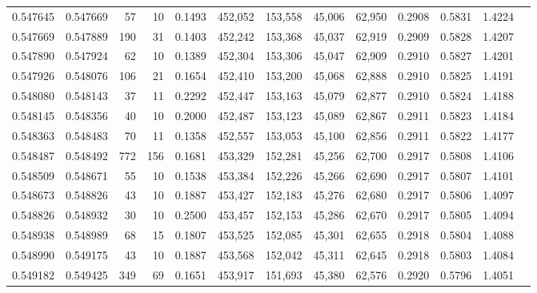 \begin{tabular}{rrrrrrrrrrrrr}
0.547645 & 0.547669 &    57 &  10 &                                     0.1493 & 452,052 & 153,558 &  45,006 &  62,950 & 0.2908 & 0.5831 & 1.4224 \\
0.547669 & 0.547889 &   190 &  31 &                                     0.1403 & 452,242 & 153,368 &  45,037 &  62,919 & 0.2909 & 0.5828 & 1.4207 \\
0.547890 & 0.547924 &    62 &  10 &                                     0.1389 & 452,304 & 153,306 &  45,047 &  62,909 & 0.2910 & 0.5827 & 1.4201 \\
0.547926 & 0.548076 &   106 &  21 &                                     0.1654 & 452,410 & 153,200 &  45,068 &  62,888 & 0.2910 & 0.5825 & 1.4191 \\
0.548080 & 0.548143 &    37 &  11 &                                     0.2292 & 452,447 & 153,163 &  45,079 &  62,877 & 0.2910 & 0.5824 & 1.4188 \\
0.548145 & 0.548356 &    40 &  10 &                                     0.2000 & 452,487 & 153,123 &  45,089 &  62,867 & 0.2911 & 0.5823 & 1.4184 \\
0.548363 & 0.548483 &    70 &  11 &                                     0.1358 & 452,557 & 153,053 &  45,100 &  62,856 & 0.2911 & 0.5822 & 1.4177 \\
0.548487 & 0.548492 &   772 & 156 &                                     0.1681 & 453,329 & 152,281 &  45,256 &  62,700 & 0.2917 & 0.5808 & 1.4106 \\
0.548509 & 0.548671 &    55 &  10 &                                     0.1538 & 453,384 & 152,226 &  45,266 &  62,690 & 0.2917 & 0.5807 & 1.4101 \\
0.548673 & 0.548826 &    43 &  10 &                                     0.1887 & 453,427 & 152,183 &  45,276 &  62,680 & 0.2917 & 0.5806 & 1.4097 \\
0.548826 & 0.548932 &    30 &  10 &                                     0.2500 & 453,457 & 152,153 &  45,286 &  62,670 & 0.2917 & 0.5805 & 1.4094 \\
0.548938 & 0.548989 &    68 &  15 &                                     0.1807 & 453,525 & 152,085 &  45,301 &  62,655 & 0.2918 & 0.5804 & 1.4088 \\
0.548990 & 0.549175 &    43 &  10 &                                     0.1887 & 453,568 & 152,042 &  45,311 &  62,645 & 0.2918 & 0.5803 & 1.4084 \\
0.549182 & 0.549425 &   349 &  69 &                                     0.1651 & 453,917 & 151,693 &  45,380 &  62,576 & 0.2920 & 0.5796 & 1.4051 \\

\end{tabular}

